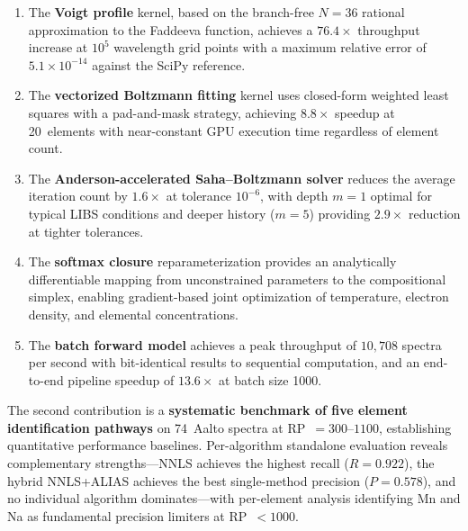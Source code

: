 \begin{enumerate}
  \item The \textbf{Voigt profile} kernel, based on the branch-free \citet{Weideman1994} $N\!=\!36$ rational approximation to the Faddeeva function, achieves a $76.4\times$ throughput increase at $10^5$ wavelength grid points with a maximum relative error of $5.1 \times 10^{-14}$ against the SciPy reference.

  \item The \textbf{vectorized Boltzmann fitting} kernel uses closed-form weighted least squares with a pad-and-mask strategy, achieving $8.8\times$ speedup at 20~elements with near-constant GPU execution time regardless of element count.

  \item The \textbf{Anderson-accelerated Saha--Boltzmann solver} reduces the average iteration count by $1.6\times$ at tolerance $10^{-6}$, with depth $m = 1$ optimal for typical LIBS conditions and deeper history ($m = 5$) providing $2.9\times$ reduction at tighter tolerances.

  \item The \textbf{softmax closure} reparameterization provides an analytically differentiable mapping from unconstrained parameters to the compositional simplex, enabling gradient-based joint optimization of temperature, electron density, and elemental concentrations.

  \item The \textbf{batch forward model} achieves a peak throughput of $10{,}708$ spectra per second with bit-identical results to sequential computation, and an end-to-end pipeline speedup of $13.6\times$ at batch size 1000.

\end{enumerate}

\noindent The second contribution is a \textbf{systematic benchmark of five element identification pathways} on 74~Aalto spectra at RP~$= 300$--$1100$, establishing quantitative performance baselines.
Per-algorithm standalone evaluation reveals complementary strengths---NNLS achieves the highest recall ($R = 0.922$), the hybrid NNLS+ALIAS achieves the best single-method precision ($P = 0.578$), and no individual algorithm dominates---with per-element analysis identifying Mn and Na as fundamental precision limiters at RP~$< 1000$.

